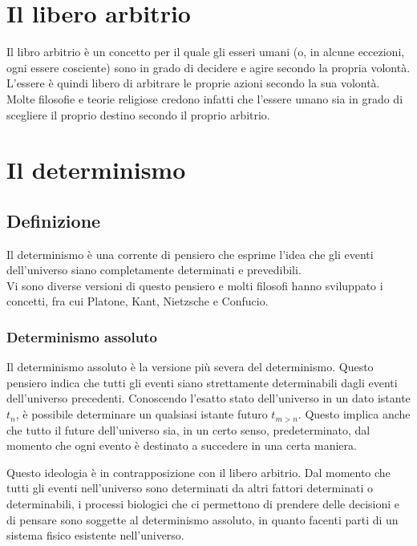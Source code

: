 \documentclass[a4paper, 12pt]{article}
\begin{document}
\section{Il libero arbitrio}

Il libro arbitrio è un concetto per il quale gli esseri umani
(o, in alcune eccezioni, ogni essere cosciente) sono in grado di decidere e agire secondo la propria volontà.
L'essere è quindi libero di arbitrare le proprie azioni secondo la sua volontà.
Molte filosofie e teorie religiose credono infatti che l'essere umano sia in grado
di scegliere il proprio destino secondo il proprio arbitrio.

\pagebreak

\section{Il determinismo}

\subsection{Definizione}

Il determinismo è una corrente di pensiero che esprime l'idea
che gli eventi dell'universo siano completamente determinati e prevedibili.
\\
Vi sono diverse versioni di questo pensiero e
molti filosofi hanno sviluppato i concetti, fra cui Platone, Kant,
Nietzsche e Confucio.

\subsubsection{Determinismo assoluto}

Il determinismo assoluto è la versione più severa del determinismo.
Questo pensiero indica che tutti gli eventi siano strettamente
determinabili dagli eventi dell'universo precedenti.
Conoscendo l'esatto stato dell'universo in un dato istante \(t_n\), è possibile
determinare un qualsiasi istante futuro \(t_{m > n}\).
Questo implica anche che tutto il future dell'universo sia,
in un certo senso, predeterminato, dal momento che ogni evento è destinato
a succedere in una certa maniera.

Questo ideologia è in contrapposizione con il libero arbitrio.
Dal momento che tutti gli eventi nell'universo sono determinati da altri fattori determinati
o determinabili, i processi biologici che ci permettono di prendere delle decisioni e di pensare
sono soggette al determinismo assoluto, in quanto facenti parti di un sistema fisico esistente nell'universo.
\end{document}
